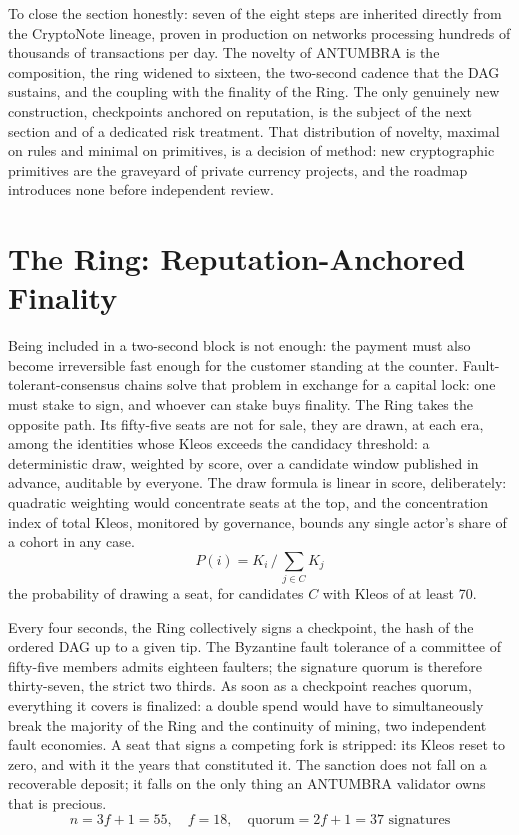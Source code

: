 To close the section honestly: seven of the eight steps are inherited
directly from the CryptoNote lineage, proven in production on networks
processing hundreds of thousands of transactions per day. The
novelty of ANTUMBRA is the composition, the ring widened to sixteen, the
two-second cadence that the DAG sustains, and the coupling with the
finality of the Ring. The only genuinely new construction, checkpoints
anchored on reputation, is the subject of the next section and of a
dedicated risk treatment. That distribution of novelty, maximal on rules
and minimal on primitives, is a decision of method: new cryptographic
primitives are the graveyard of private currency projects, and the
roadmap introduces none before independent review.

\section{The Ring: Reputation-Anchored Finality}\label{sec:ring}

Being included in a two-second block is not enough: the payment must also
become irreversible fast enough for the customer standing at the counter.
Fault-tolerant-consensus chains solve that problem in exchange for a
capital lock: one must stake to sign, and whoever can stake buys
finality. The Ring takes the opposite path. Its fifty-five seats are not
for sale, they are drawn, at each era, among the identities whose Kleos
exceeds the candidacy threshold: a deterministic draw, weighted by score,
over a candidate window published in advance, auditable by everyone. The
draw formula is linear in score, deliberately: quadratic weighting would
concentrate seats at the top, and the concentration index of total Kleos,
monitored by governance, bounds any single actor's share of a cohort in
any case.
\begin{equation}\label{eq:draw}
P(i) = K_i \,\big/\, \sum_{j \in C} K_j
\end{equation}
the probability of drawing a seat, for candidates $C$ with Kleos of at
least 70.

Every four seconds, the Ring collectively signs a checkpoint, the hash of
the ordered DAG up to a given tip. The Byzantine fault tolerance of a
committee of fifty-five members admits eighteen faulters; the signature
quorum is therefore thirty-seven, the strict two thirds. As soon as a
checkpoint reaches quorum, everything it covers is finalized: a double
spend would have to simultaneously break the majority of the Ring and the
continuity of mining, two independent fault economies. A seat that signs
a competing fork is stripped: its Kleos reset to zero, and with it the
years that constituted it. The sanction does not fall on a recoverable
deposit; it falls on the only thing an ANTUMBRA validator owns that is
precious.
\begin{equation}\label{eq:bft}
n = 3f + 1 = 55,\quad f = 18,\quad \text{quorum} = 2f + 1 = 37 \text{ signatures}
\end{equation}

